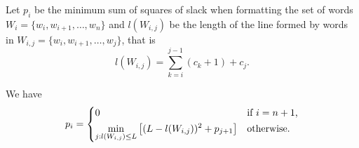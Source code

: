 \documentclass{article}
\begin{document}
Let $p_i$ be the minimum sum of squares of slack when formatting the set of words $W_i = \{w_i, w_{i + 1}, \dots, w_n\}$ and $l(W_{i, j})$ be the length of the line formed by words in $W_{i, j} = \{w_i, w_{i + 1}, \dots, w_j\}$, that is
\[
    l(W_{i, j}) = \sum_{k = i}^{j - 1} (c_k + 1) + c_j.
\]

We have
\[
    p_i = \begin{dcases*}
        0 & if $i = n + 1$,\\
        \min_{j: l(W_{i, j}) \le L} \left[(L - l(W_{i, j}))^2 + p_{j + 1}\right] & otherwise.
    \end{dcases*}
\]
\end{document}

